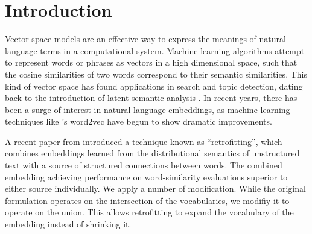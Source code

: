 \documentclass[letterpaper]{article}
\title{\thetitle}
\begin{document}
\maketitle
\begin{abstract}
Generating vector representations of words with machine learning has become an
increasing successful approach for semantic analysis. In particular, they have
become very accurate at identifying related words, like a human would. In this
paper, we show the effectiveness of combining existing embeddings learned by
GloVe \cite{pennington2014glove} with structured knowledge from the semantic
network ConceptNet 5 \cite{speer2012conceptnet}, taking care to merge them into
a common word representation. The resulting vector space has a larger vocabulary
than either source, can represent word meanings in multiple languages, and
achieves state-of-the-art performance on word similarity evaluations. In
particular, its score of $\rho = \scoreRW{}$ on an evaluation of rare words
\cite{luong2013rw} is 13.6\% higher than the previous best known system.
\end{abstract}

\section{Introduction}
Vector space models are an effective way to express the meanings of
natural-language terms in a computational system. Machine learning algorithms
attempt to represent words or phrases as vectors in a high dimensional space,
such that the cosine similarities of two words correspond to their semantic
similarities. This kind of vector space has found applications in search and
topic detection, dating back to the introduction of latent semantic analysis
\cite{deerwester1990indexing}.
In recent years, there has been a surge of
interest in natural-language embeddings, as machine-learning techniques like
's word2vec have begun to show dramatic improvements.

  A recent paper from  introduced a technique
 known as ``retrofitting'', which combines embeddings learned from the
 distributional semantics of unstructured text with a source of structured
 connections between words. The combined embedding achieving performance on
 word-similarity evaluations superior to either source individually. We apply a
 number of modification. While the original formulation operates on the
 intersection of the vocabularies, we modifiy it to operate on the union. This
 allows retrofitting to expand the vocabulary of the embedding instead of
 shrinking it.
\end{document}
